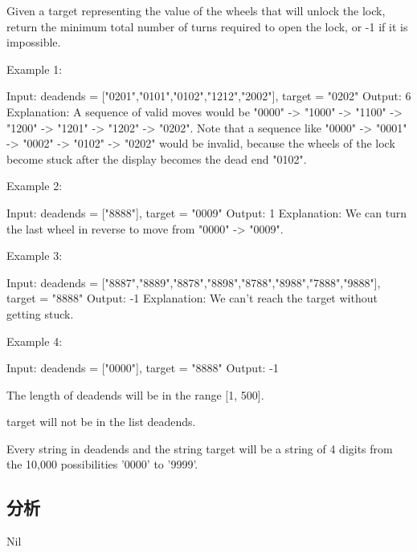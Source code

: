 Given a target representing the value of the wheels that will unlock the lock, return the minimum total number of turns required to open the lock, or -1 if it is impossible.

Example 1:
\begin{Code}
Input: deadends = ["0201","0101","0102","1212","2002"], target = "0202"
Output: 6
Explanation:
A sequence of valid moves would be "0000" -> "1000" -> "1100" -> "1200" -> "1201" -> "1202" -> "0202".
Note that a sequence like "0000" -> "0001" -> "0002" -> "0102" -> "0202" would be invalid,
because the wheels of the lock become stuck after the display becomes the dead end "0102".
\end{Code}

Example 2:
\begin{Code}
Input: deadends = ["8888"], target = "0009"
Output: 1
Explanation:
We can turn the last wheel in reverse to move from "0000" -> "0009".
\end{Code}

Example 3:
\begin{Code}
Input: deadends = ["8887","8889","8878","8898","8788","8988","7888","9888"], target = "8888"
Output: -1
Explanation:
We can't reach the target without getting stuck.
\end{Code}

Example 4:
\begin{Code}
Input: deadends = ["0000"], target = "8888"
Output: -1
\end{Code}

\begindot
\item The length of deadends will be in the range [1, 500].
\item target will not be in the list deadends.
\item Every string in deadends and the string target will be a string of 4 digits from the 10,000 possibilities '0000' to '9999'.
\myenddot

\subsection{分析}
Nil

